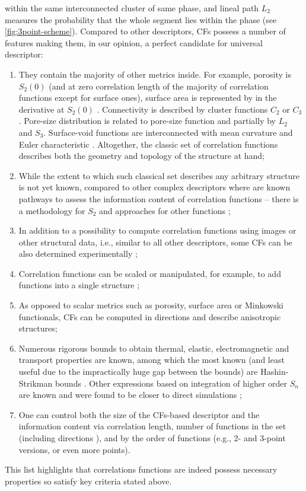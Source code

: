 \documentclass[reprint,amsmath,amssymb,aps,pre,showkeys,showpacs]{revtex4-1}
\begin{document}
within the same interconnected cluster of same phase, and lineal path $L_2$
measures the probability that the whole segment lies within the phase (see
\cref{fig:3point-scheme}). Compared to other descriptors, CFs possess a number
of features making them, in our opinion, a perfect candidate for universal
descriptor:
\begin{enumerate}
  \item They contain the majority of other metrics inside. For example, porosity
    is $S_2(0)$ (and at zero correlation length of the majority of correlation
    functions except for surface ones), surface area is represented by in the
    derivative at $S_2(0)$ \cite{debye1957scattering}. Connectivity is described by cluster
    functions $C_2$ or $C_3$. Pore-size distribution is related to pore-size
    function and partially by $L_2$ and $S_3$. Surface-void functions are
    interconnected with mean curvature and Euler characteristic
    \cite{ma2020generation}. Altogether, the classic set of correlation
    functions describes both the geometry and topology of the structure at hand;
  \item While the extent to which such classical set describes any arbitrary
    structure is not yet known, compared to other complex descriptors where are
    known pathways to assess the information content of correlation functions --
    there is a methodology for $S_2$ \cite{Gommes2} and approaches for other
    functions \cite{Degeneraty.045306,CHERKASOV2024129400};
  \item In addition to a possibility to compute correlation functions using
    images or other structural data, i.e., similar to all other descriptors,
    some CFs can be also determined experimentally
    \cite{debye1957scattering,barrall1992nmr,dietrich1995scattering,li2018accurate};
  \item Correlation functions can be scaled \cite{karsaninaPRL} or manipulated,
    for example, to add functions into a single structure \cite{moctezuma2002};
  \item As opposed to scalar metrics such as porosity, surface area or Minkowski
    functionals, CFs can be computed in directions and describe anisotropic
    structures;
  \item Numerous rigorous bounds to obtain thermal, elastic, electromagnetic and
    transport properties are known, among which the most known (and least useful
    due to the impractically huge gap between the bounds) are Hashin-Strikman
    bounds \cite{hashin1963variational}. Other expressions based on integration
    of higher order $S_n$ are known and were found to be closer to direct
    simulations
    \cite{brown1955solid,beran1965use,milton1981bounds,hlushkou2015effective};
  \item One can control both the size of the CFs-based descriptor and the
    information content via correlation length, number of functions in the set
    (including directions \cite{EPL2}), and by the order of functions (e.g., 2-
    and 3-point versions, or even more points).
\end{enumerate}
This list highlights that correlations functions are indeed possess necessary
properties so satisfy key criteria stated above.
\end{document}
